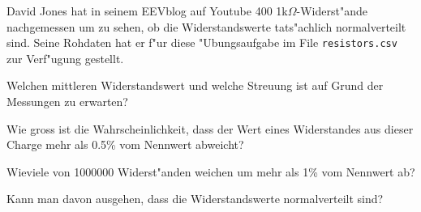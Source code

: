 David Jones hat in seinem EEVblog auf Youtube 400 1k$\Omega$-Widerst"ande
nachgemessen um zu sehen, ob die Widerstandswerte tats"achlich normalverteilt
sind. Seine Rohdaten hat er f"ur diese "Ubungsaufgabe im File
\verb+resistors.csv+ zur Verf"ugung gestellt.
\begin{teilaufgaben}
\item Welchen mittleren Widerstandswert und welche Streuung ist auf Grund
der Messungen zu erwarten?
\item Wie gross ist die Wahrscheinlichkeit, dass der Wert eines Widerstandes
aus dieser Charge mehr als 0.5\% vom Nennwert abweicht?
\item Wieviele von 1000000 Widerst"anden weichen um mehr als 1\% vom
Nennwert ab?
\item Kann man davon ausgehen, dass die Widerstandswerte normalverteilt sind?
\end{teilaufgaben}

